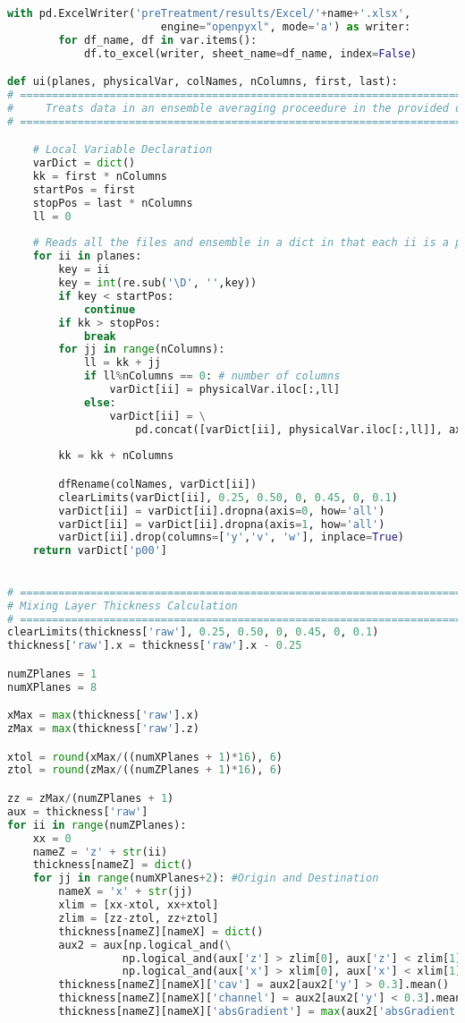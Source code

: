 \begin{lstlisting}[language=python]
    with pd.ExcelWriter('preTreatment/results/Excel/'+name+'.xlsx',
                        engine="openpyxl", mode='a') as writer:
        for df_name, df in var.items():
            df.to_excel(writer, sheet_name=df_name, index=False)

def ui(planes, physicalVar, colNames, nColumns, first, last):
# =============================================================================
#     Treats data in an ensemble averaging proceedure in the provided direction
# =============================================================================

    # Local Variable Declaration
    varDict = dict()
    kk = first * nColumns
    startPos = first
    stopPos = last * nColumns
    ll = 0
  
    # Reads all the files and ensemble in a dict in that each ii is a plane
    for ii in planes:
        key = ii
        key = int(re.sub('\D', '',key))
        if key < startPos:
            continue
        if kk > stopPos: 
            break
        for jj in range(nColumns):
            ll = kk + jj
            if ll%nColumns == 0: # number of columns
                varDict[ii] = physicalVar.iloc[:,ll]
            else:
                varDict[ii] = \
                    pd.concat([varDict[ii], physicalVar.iloc[:,ll]], axis=1)
                    
        kk = kk + nColumns

        dfRename(colNames, varDict[ii])
        clearLimits(varDict[ii], 0.25, 0.50, 0, 0.45, 0, 0.1)
        varDict[ii] = varDict[ii].dropna(axis=0, how='all')
        varDict[ii] = varDict[ii].dropna(axis=1, how='all')
        varDict[ii].drop(columns=['y','v', 'w'], inplace=True)
    return varDict['p00']
    

# =============================================================================
# Mixing Layer Thickness Calculation
# =============================================================================
clearLimits(thickness['raw'], 0.25, 0.50, 0, 0.45, 0, 0.1)
thickness['raw'].x = thickness['raw'].x - 0.25

numZPlanes = 1
numXPlanes = 8

xMax = max(thickness['raw'].x)
zMax = max(thickness['raw'].z)

xtol = round(xMax/((numXPlanes + 1)*16), 6)
ztol = round(zMax/((numZPlanes + 1)*16), 6)

zz = zMax/(numZPlanes + 1)
aux = thickness['raw']
for ii in range(numZPlanes):
    xx = 0
    nameZ = 'z' + str(ii)
    thickness[nameZ] = dict()
    for jj in range(numXPlanes+2): #Origin and Destination
        nameX = 'x' + str(jj)
        xlim = [xx-xtol, xx+xtol]
        zlim = [zz-ztol, zz+ztol]
        thickness[nameZ][nameX] = dict()
        aux2 = aux[np.logical_and(\
                  np.logical_and(aux['z'] > zlim[0], aux['z'] < zlim[1]),\
                  np.logical_and(aux['x'] > xlim[0], aux['x'] < xlim[1]))]
        thickness[nameZ][nameX]['cav'] = aux2[aux2['y'] > 0.3].mean()
        thickness[nameZ][nameX]['channel'] = aux2[aux2['y'] < 0.3].mean()
        thickness[nameZ][nameX]['absGradient'] = max(aux2['absGradient'])
        

\end{lstlisting}
